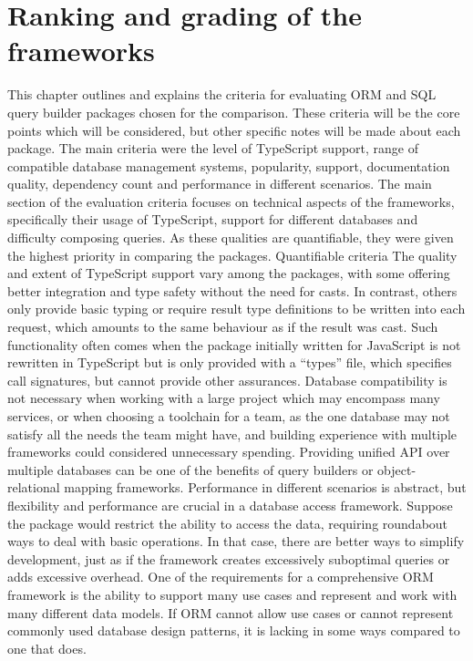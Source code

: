 \chapter{Ranking and grading of the frameworks}

This chapter outlines and explains the criteria for evaluating ORM and SQL query builder packages chosen for the comparison. These criteria will be the core points which will be considered, but other specific notes will be made about each package. The main criteria were the level of TypeScript support, range of compatible database management systems, popularity, support, documentation quality, dependency count and performance in different scenarios.
The main section of the evaluation criteria focuses on technical aspects of the frameworks, specifically their usage of TypeScript, support for different databases and difficulty composing queries. As these qualities are quantifiable, they were given the highest priority in comparing the packages.
Quantifiable criteria
The quality and extent of TypeScript support vary among the packages, with some offering better integration and type safety without the need for casts. In contrast, others only provide basic typing or require result type definitions to be written into each request, which amounts to the same behaviour as if the result was cast. Such functionality often comes when the package initially written for JavaScript is not rewritten in TypeScript but is only provided with a “types” file, which specifies call signatures, but cannot provide other assurances.
Database compatibility is not necessary when working with a large project which may encompass many services, or when choosing a toolchain for a team, as the one database may not satisfy all the needs the team might have, and building experience with multiple frameworks could considered unnecessary spending. Providing unified API over multiple databases can be one of the benefits of query builders or object-relational mapping frameworks. 
Performance in different scenarios is abstract, but flexibility and performance are crucial in a database access framework. Suppose the package would restrict the ability to access the data, requiring roundabout ways to deal with basic operations. In that case, there are better ways to simplify development, just as if the framework creates excessively suboptimal queries or adds excessive overhead. One of the requirements for a comprehensive ORM framework is the ability to support many use cases and represent and work with many different data models. If ORM cannot allow use cases or cannot represent commonly used database design patterns, it is lacking in some ways compared to one that does. 
